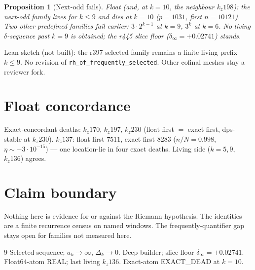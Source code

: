\documentclass[11pt]{article}
\newtheorem{prop}{Proposition}
\begin{document}
\begin{prop}[Next-odd fails]\label{prop:family}
Float (and, at $k=10$, the neighbour
$k_z198$): the next-odd family lives for
$k\le 9$ and dies at $k=10$
($p=1031$, first $n=10121$).
Two other predefined families fail earlier:
$3\cdot 2^{k-1}$ at $k=9$, $3^k$ at $k=6$.
No living $\delta$-sequence past $k=9$ is
obtained; the r445 slice floor
($\delta_\infty=+0.02741$) stands.
\end{prop}

Lean sketch (not built): the r397 selected
family remains a finite living prefix
$k\le 9$.  No revision of
\texttt{rh\_of\_frequently\_selected}.
Other cofinal meshes stay a reviewer fork.

\section{Float concordance}\label{sec:float}

Exact-concordant deaths: $k_z170$, $k_z197$,
$k_z230$ (float first $=$ exact first,
dps-stable at $k_z230$).
$k_z137$: float first $7511$, exact first
$8283$ ($n/N=0.998$, $\eta\sim -3\cdot 10^{-15}$)
--- one location-lie in four exact deaths.
Living side ($k=5,9$, $k_z136$) agrees.

\section*{Claim boundary}

Nothing here is evidence for or against the Riemann
hypothesis.
The identities are a finite recurrence census
on named windows.
The frequently-quantifier gap stays open for
families not measured here.

\begin{thebibliography}{9}
 Selected sequence; $a_k\to\infty$, $\Delta_k\to 0$.
 Deep builder; slice floor $\delta_\infty=+0.02741$.
 Float64-atom REAL; last living $k_z136$.
 Exact-atom EXACT\_DEAD at $k=10$.
\end{thebibliography}
\end{document}
